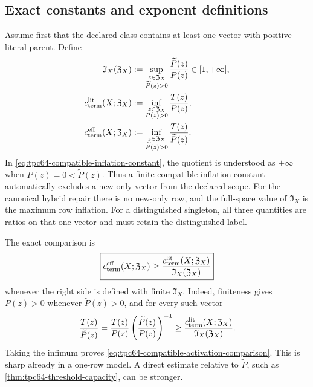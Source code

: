 \subsection{Exact constants and exponent definitions}

Assume first that the declared class contains at least one vector with
positive literal parent.  Define
\begin{align}
 \mathfrak I_X(\mathfrak Z_X)
 &:=
 \sup_{\substack{z\in\mathfrak Z_X\\\widetilde P(z)>0}}
 \frac{\widetilde P(z)}{P(z)}
 \in[1,+\infty],
 \label{eq:tpc64-compatible-inflation-constant}\\
 c_{\rm term}^{\rm lit}(X;\mathfrak Z_X)
 &:=
 \inf_{\substack{z\in\mathfrak Z_X\\P(z)>0}}
 \frac{T(z)}{P(z)},
 \label{eq:tpc64-literal-terminal-constant}\\
 c_{\rm term}^{\rm eff}(X;\mathfrak Z_X)
 &:=
 \inf_{\substack{z\in\mathfrak Z_X\\
                  \widetilde P(z)>0}}
 \frac{T(z)}{\widetilde P(z)}.
 \label{eq:tpc64-effective-terminal-constant}
\end{align}
In \eqref{eq:tpc64-compatible-inflation-constant}, the quotient is
understood as \(+\infty\) when
\(P(z)=0<\widetilde P(z)\).  Thus a finite compatible inflation
constant automatically excludes a new-only vector from the declared
scope.
For the canonical hybrid repair there is no new-only row, and the
full-space value of \(\mathfrak I_X\) is the maximum row inflation.  For a
distinguished singleton, all three quantities are ratios on that one
vector and must retain the distinguished label.

The exact comparison is
\begin{equation}
 \boxed{
 c_{\rm term}^{\rm eff}(X;\mathfrak Z_X)
 \ge
 \frac{c_{\rm term}^{\rm lit}(X;\mathfrak Z_X)}
      {\mathfrak I_X(\mathfrak Z_X)}}
 \label{eq:tpc64-compatible-activation-comparison}
\end{equation}
whenever the right side is defined with finite
\(\mathfrak I_X\).  Indeed, finiteness gives \(P(z)>0\) whenever
\(\widetilde P(z)>0\), and for every such vector
\[
 \frac{T(z)}{\widetilde P(z)}
 =
 \frac{T(z)}{P(z)}
 \left(\frac{\widetilde P(z)}{P(z)}\right)^{-1}
 \ge
 \frac{c_{\rm term}^{\rm lit}(X;\mathfrak Z_X)}
      {\mathfrak I_X(\mathfrak Z_X)}.
\]
Taking the infimum proves
\eqref{eq:tpc64-compatible-activation-comparison}.  This is sharp
already in a one-row model.  A direct estimate relative to
\(\widetilde P\), such as
\cref{thm:tpc64-threshold-capacity}, can be stronger.

